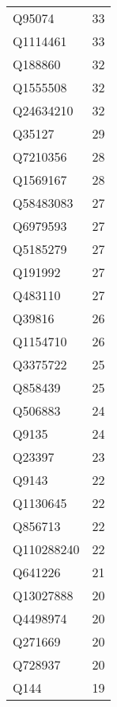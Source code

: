 \begin{tabular}{lr}
      Q95074 &                            33 \\
    Q1114461 &                            33 \\
     Q188860 &                            32 \\
    Q1555508 &                            32 \\
   Q24634210 &                            32 \\
      Q35127 &                            29 \\
    Q7210356 &                            28 \\
    Q1569167 &                            28 \\
   Q58483083 &                            27 \\
    Q6979593 &                            27 \\
    Q5185279 &                            27 \\
     Q191992 &                            27 \\
     Q483110 &                            27 \\
      Q39816 &                            26 \\
    Q1154710 &                            26 \\
    Q3375722 &                            25 \\
     Q858439 &                            25 \\
     Q506883 &                            24 \\
       Q9135 &                            24 \\
      Q23397 &                            23 \\
       Q9143 &                            22 \\
    Q1130645 &                            22 \\
     Q856713 &                            22 \\
  Q110288240 &                            22 \\
     Q641226 &                            21 \\
   Q13027888 &                            20 \\
    Q4498974 &                            20 \\
     Q271669 &                            20 \\
     Q728937 &                            20 \\
        Q144 &                            19 \\

\end{tabular}
